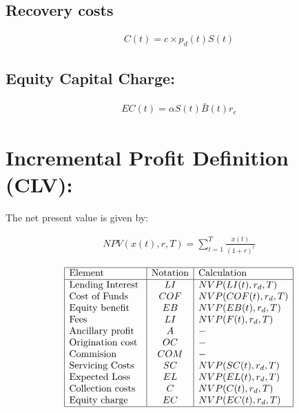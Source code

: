 \subsection{Recovery costs}
\begin{align}
C(t) = c\times p_d(t) S(t)
\end{align}

\subsection{ Equity Capital Charge: }
\begin{align}
 EC(t) =  \alpha S(t)\bar{ B}(t) r_e
\end{align}


\section{ Incremental Profit Definition (CLV): }
The net present value is given by:

\begin{align}
NPV(x(t),r,T)=\sum_{t=1}^T \frac{x(t)}{(1+r)^t}
\end{align}

\renewcommand{\arraystretch}{1.5} %
\begin{center} %
\[ %
\begin{array}{|l|c|l|} \hline %
\mbox{Element} & \mbox{Notation} & \mbox{Calculation}\\ \hline
\mbox{Lending Interest }  & LI & NVP(LI(t),r_d,T)\\
\mbox{Cost of Funds   }  & COF & NVP(COF(t),r_d,T)\\
\mbox{Equity benefit }  & EB & NVP(EB(t),r_d,T)\\
\mbox{Fees }  & LI & NVP(F(t),r_d,T)\\
\mbox{Ancillary profit }  & A & -\\
\mbox{Origination cost}  & OC & -\\
\mbox{Commision  }  & COM & -\\
\mbox{Servicing Costs}  & SC & NVP(SC(t),r_d,T)\\
\mbox{Expected Loss }  & EL & NVP(EL(t),r_d,T)\\
\mbox{Collection costs }  & C & NVP(C(t),r_d,T)\\
\mbox{Equity charge}  & EC & NVP(EC(t),r_d,T)\\

\hline
\end{array} %
\] %
\end{center}

